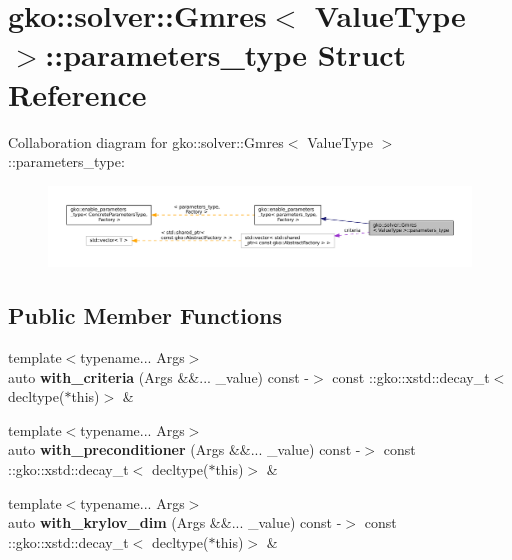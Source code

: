 \hypertarget{structgko_1_1solver_1_1Gmres_1_1parameters__type}{}\section{gko\+:\+:solver\+:\+:Gmres$<$ Value\+Type $>$\+:\+:parameters\+\_\+type Struct Reference}
\label{structgko_1_1solver_1_1Gmres_1_1parameters__type}


Collaboration diagram for gko\+:\+:solver\+:\+:Gmres$<$ Value\+Type $>$\+:\+:parameters\+\_\+type\+:
\nopagebreak
\begin{figure}[H]
\begin{center}
\leavevmode
\includegraphics[width=350pt]{structgko_1_1solver_1_1Gmres_1_1parameters__type__coll__graph}
\end{center}
\end{figure}
\subsection*{Public Member Functions}
\begin{DoxyCompactItemize}
\item 
\mbox{\label{structgko_1_1solver_1_1Gmres_1_1parameters__type_a580ff1c8cf7354efffcb873043a34424}} 
{\footnotesize template$<$typename... Args$>$ }\\auto {\bfseries with\+\_\+criteria} (Args \&\&... \+\_\+value) const -\/$>$ const \+::gko\+::xstd\+::decay\+\_\+t$<$ decltype($\ast$this)$>$ \&
\item 
\mbox{\label{structgko_1_1solver_1_1Gmres_1_1parameters__type_ac8a073375548b5ea0886bbcb03a418dc}} 
{\footnotesize template$<$typename... Args$>$ }\\auto {\bfseries with\+\_\+preconditioner} (Args \&\&... \+\_\+value) const -\/$>$ const \+::gko\+::xstd\+::decay\+\_\+t$<$ decltype($\ast$this)$>$ \&
\item 
\mbox{\label{structgko_1_1solver_1_1Gmres_1_1parameters__type_ae3c4009513039ea0c70fa146e5072863}} 
{\footnotesize template$<$typename... Args$>$ }\\auto {\bfseries with\+\_\+krylov\+\_\+dim} (Args \&\&... \+\_\+value) const -\/$>$ const \+::gko\+::xstd\+::decay\+\_\+t$<$ decltype($\ast$this)$>$ \&
\end{DoxyCompactItemize}
